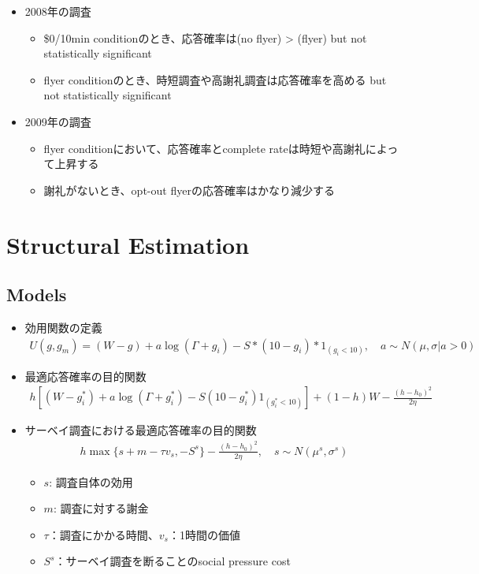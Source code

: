 \documentclass[../root]{subfiles}
\begin{document}
    \begin{itemize}
        \item 2008年の調査
        \begin{itemize}
            \item \$0/10min conditionのとき、応答確率は(no flyer) > (flyer) but not statistically significant
            \item flyer conditionのとき、時短調査や高謝礼調査は応答確率を高める but not statistically significant
        \end{itemize}
        \item 2009年の調査
        \begin{itemize}
            \item flyer conditionにおいて、応答確率とcomplete rateは時短や高謝礼によって上昇する
            \item 謝礼がないとき、opt-out flyerの応答確率はかなり減少する
        \end{itemize}
    \end{itemize}


    \section{Structural Estimation}

    \subsection{Models}

    \begin{itemize}
        \item 効用関数の定義
        \begin{align*}
            U(g, g_m) = (W - g) + a \log(\Gamma + g_i) - S*(10 - g_i)*1_{(g_i < 10)}, \quad
            a \sim N(\mu, \sigma | a > 0)
        \end{align*}
        \item 最適応答確率の目的関数
        \begin{align*}
            h[(W-g_i^*) + a \log(\Gamma + g_i^*) - S(10-g_i^*)1_{(g_i^* < 10)}] + (1 - h) W - \frac{(h - h_0)^2}{2\eta}
        \end{align*}
        \item サーベイ調査における最適応答確率の目的関数
        \begin{align*}
            h \max\{s + m - \tau v_s, -S^s\} - \frac{(h-h_0)^2}{2\eta}, \quad s \sim N(\mu^s, \sigma^s)
        \end{align*}
        \begin{itemize}
            \item $s$: 調査自体の効用
            \item $m$: 調査に対する謝金
            \item $\tau$：調査にかかる時間、$v_s$：1時間の価値
            \item $S^s$：サーベイ調査を断ることのsocial pressure cost
        \end{itemize}
    \end{itemize}
\end{document}
